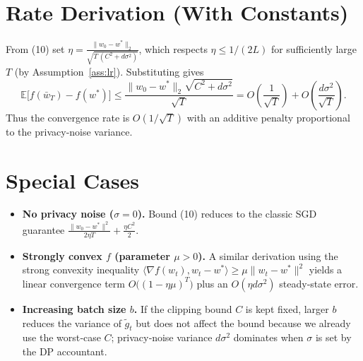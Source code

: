 \documentclass{article}
\newcommand{\E}{\mathbb{E}}
\begin{document}
\section*{Rate Derivation (With Constants)}
From (10) set $\eta=\frac{\|w_0-w^{*}\|_2}{\sqrt{T\,(C^{2}+d\sigma^{2})}}$, which respects $\eta\le 1/(2L)$ for sufficiently large $T$ (by Assumption~\ref{ass:lr}).  Substituting gives
\[
\E\!\big[f(\bar w_T)-f(w^{*})\big]
\le \frac{\|w_0-w^{*}\|_2\sqrt{C^{2}+d\sigma^{2}}}{\sqrt{T}}
=O\!\left(\frac{1}{\sqrt{T}}\right)
+O\!\left(\frac{d\sigma^{2}}{\sqrt{T}}\right).
\]
Thus the convergence rate is $O(1/\sqrt{T})$ with an additive penalty proportional to the privacy‑noise variance.

\section*{Special Cases}
\begin{itemize}[leftmargin=*]
\item \textbf{No privacy noise ($\sigma=0$).} Bound (10) reduces to the classic SGD guarantee $\frac{\|w_0-w^{*}\|^{2}}{2\eta T}+\frac{\eta C^{2}}{2}$.
\item \textbf{Strongly convex $f$ (parameter $\mu>0$).} A similar derivation using the strong convexity inequality
$\langle\nabla f(w_t),w_t-w^{*}\rangle\ge \mu\|w_t-w^{*}\|^{2}$
yields a linear convergence term $O\big((1-\eta\mu)^{T}\big)$ plus an $O(\eta d\sigma^{2})$ steady‑state error.
\item \textbf{Increasing batch size $b$.} If the clipping bound $C$ is kept fixed, larger $b$ reduces the variance of $\tilde g_t$ but does not affect the bound because we already use the worst‑case $C$; privacy‑noise variance $d\sigma^{2}$ dominates when $\sigma$ is set by the DP accountant.
\end{itemize}

\end{document}
